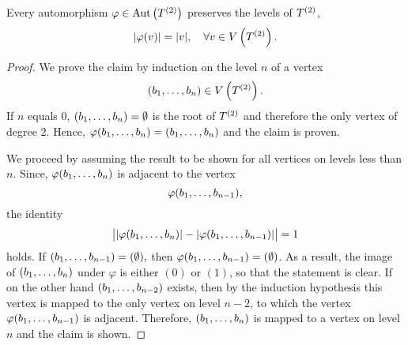 \begin{thm}\label{thm:Levels are preserved}
Every automorphism $\varphi\in\AutT$ preserves the levels of $\T$, \ie{}
\begin{equation*}
\lvert \varphi(v)\rvert=\lvert v\rvert,\quad\forall v\in\VT.
\end{equation*}
\end{thm}

\begin{proof}
We prove the claim by induction on the level $n$ of a vertex 
\[ (\seq{b})\in\VT.\]
If $n$ equals $ 0 $, $(\seq{b})=\emptyset$ is the root of $\T$ and therefore the only vertex of degree $ 2 $. Hence, $\varphi(\seq{b})=(\seq{b})$ and the claim is proven.

We proceed by assuming the result to be shown for all vertices on levels less than $n$. Since, $\varphi(\seq{b})$ is adjacent to the vertex 
\[ \varphi(\seq[n-1]{b}), \] 
the identity
\begin{equation*}
\big\lvert\lvert\varphi(\seq{b})\rvert-\lvert\varphi(\seq[n-1]{b})\rvert\big\rvert=1
\end{equation*}
holds. If $(\seq[n-1]{b})=(\emptyset),$ then $\varphi(\seq[n-1]{b})=(\emptyset)$. As a result, the image of $(\seq{b})$ under $\varphi$ is either $(0)$ or $(1)$, so that the statement is clear. If on the other hand $(\seq[n-2]{b})$ exists, then by the induction hypothesis this vertex is mapped  to the only vertex on level $n-2$, to which the vertex $\varphi(\seq[n-1]{b})$ is adjacent. Therefore, $(\seq{b})$ is mapped to a vertex on level $n$ and the claim is shown.
\end{proof}

